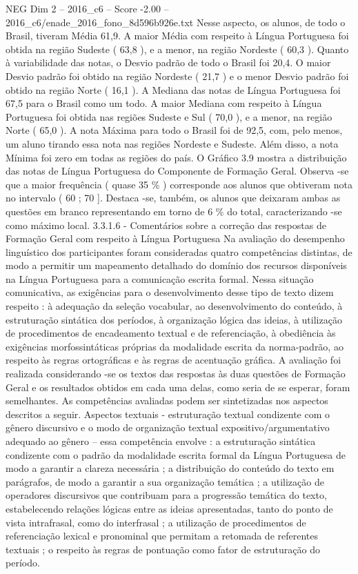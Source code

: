 \begin{textsample}{NEG Dim 2 – 2016\_c6 – Score -2.00 – 2016\_c6/enade\_2016\_fono\_8d596b926e.txt}
Nesse aspecto, os alunos, de todo o Brasil, tiveram Média 61,9.
A maior Média com respeito à Língua Portuguesa foi obtida na região Sudeste ( 63,8 ), e a menor, na região Nordeste ( 60,3 ).
Quanto à variabilidade das notas, o Desvio padrão de todo o Brasil foi 20,4.
O maior Desvio padrão foi obtido na região Nordeste ( 21,7 ) e o menor Desvio padrão foi obtido na região Norte ( 16,1 ).
A Mediana das notas de Língua Portuguesa foi 67,5 para o Brasil como um todo.
A maior Mediana com respeito à Língua Portuguesa foi obtida nas regiões Sudeste e Sul ( 70,0 ), e a menor, na região Norte ( 65,0 ).
A nota Máxima para todo o Brasil foi de 92,5, com, pelo menos, um aluno tirando essa nota nas regiões Nordeste e Sudeste.
Além disso, a nota Mínima foi zero em todas as regiões do país.
O Gráfico 3.9 mostra a distribuição das notas de Língua Portuguesa do Componente de Formação Geral.
Observa -se que a maior frequência ( quase 35 \% ) corresponde aos alunos que obtiveram nota no intervalo ( 60 ; 70 ].
Destaca -se, também, os alunos que deixaram ambas as questões em branco representando em torno de 6 \% do total, caracterizando -se como máximo local. 3.3.1.6 - Comentários sobre a correção das respostas de Formação Geral com respeito à Língua Portuguesa Na avaliação do desempenho linguístico dos participantes foram consideradas quatro competências distintas, de modo a permitir um mapeamento detalhado do domínio dos recursos disponíveis na Língua Portuguesa para a comunicação escrita formal.
Nessa situação comunicativa, as exigências para o desenvolvimento desse tipo de texto dizem respeito : à adequação da seleção vocabular, ao desenvolvimento do conteúdo, à estruturação sintática dos períodos, à organização lógica das ideias, à utilização de procedimentos de encadeamento textual e de referenciação, à obediência às exigências morfossintáticas próprias da modalidade escrita da norma-padrão, ao respeito às regras ortográficas e às regras de acentuação gráfica.
A avaliação foi realizada considerando -se os textos das respostas às duas questões de Formação Geral e os resultados obtidos em cada uma delas, como seria de se esperar, foram semelhantes.
As competências avaliadas podem ser sintetizadas nos aspectos descritos a seguir.
Aspectos textuais - estruturação textual condizente com o gênero discursivo e o modo de organização textual expositivo/argumentativo adequado ao gênero – essa competência envolve : a estruturação sintática condizente com o padrão da modalidade escrita formal da Língua Portuguesa de modo a garantir a clareza necessária ; a distribuição do conteúdo do texto em parágrafos, de modo a garantir a sua organização temática ; a utilização de operadores discursivos que contribuam para a progressão temática do texto, estabelecendo relações lógicas entre as ideias apresentadas, tanto do ponto de vista intrafrasal, como do interfrasal ; a utilização de procedimentos de referenciação lexical e pronominal que permitam a retomada de referentes textuais ; o respeito às regras de pontuação como fator de estruturação do período.

\end{textsample}

